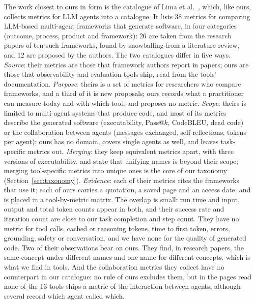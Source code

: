 \documentclass[conference]{IEEEtran}
\begin{document}
The work closest to ours in form is the catalogue of Lima et al.~\cite{lima2026catalogue}, which, like ours, collects metrics for LLM agents into a catalogue. It lists 38 metrics for comparing LLM-based multi-agent frameworks that generate software, in four categories (outcome, process, product and framework): 26 are taken from the research papers of ten such frameworks, found by snowballing from a literature review, and 12 are proposed by the authors. The two catalogues differ in five ways. \emph{Source}: their metrics are those that framework authors report in papers; ours are those that observability and evaluation tools ship, read from the tools' documentation. \emph{Purpose}: theirs is a set of metrics for researchers who compare frameworks, and a third of it is new proposals; ours records what a practitioner can measure today and with which tool, and proposes no metric. \emph{Scope}: theirs is limited to multi-agent systems that produce code, and most of its metrics describe the generated software (executability, Pass@$k$, CodeBLEU, dead code) or the collaboration between agents (messages exchanged, self-reflections, tokens per agent); ours has no domain, covers single agents as well, and leaves task-specific metrics out. \emph{Merging}: they keep equivalent metrics apart, with three versions of executability, and state that unifying names is beyond their scope; merging tool-specific metrics into unique ones is the core of our taxonomy (Section~\ref{sec:taxonomy}). \emph{Evidence}: each of their metrics cites the frameworks that use it; each of ours carries a quotation, a saved page and an access date, and is placed in a tool-by-metric matrix. The overlap is small: run time and input, output and total token counts appear in both, and their success rate and iteration count are close to our task completion and step count. They have no metric for tool calls, cached or reasoning tokens, time to first token, errors, grounding, safety or conversation, and we have none for the quality of generated code. Two of their observations bear on ours. They find, in research papers, the same concept under different names and one name for different concepts, which is what we find in tools. And the collaboration metrics they collect have no counterpart in our catalogue: no rule of ours excludes them, but in the pages read none of the 13 tools ships a metric of the interaction between agents, although several record which agent called which.
\end{document}
